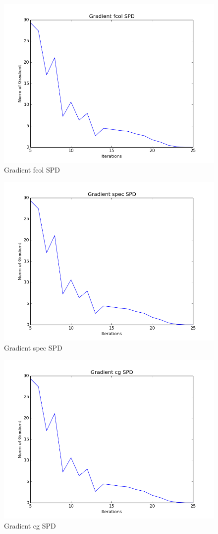 \documentclass{article}
\begin{document}
\begin{figure}[H]
  \centering
  \includegraphics[scale=0.5]{fcolspd.png}
  \caption{Gradient fcol SPD}
\end{figure}
\begin{figure}[H]
  \centering
  \includegraphics[scale=0.5]{specspd.png}
  \caption{Gradient spec SPD}
\end{figure}
\begin{figure}[H]
  \centering
  \includegraphics[scale=0.5]{cgspd.png}
  \caption{Gradient cg SPD}
\end{figure}
\end{document}
